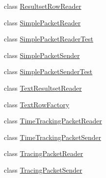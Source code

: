 \begin{DoxyCompactItemize}
\item 
class \mbox{\hyperlink{classcom_1_1mysql_1_1cj_1_1protocol_1_1a_1_1_resultset_row_reader}{Resultset\+Row\+Reader}}
\item 
class \mbox{\hyperlink{classcom_1_1mysql_1_1cj_1_1protocol_1_1a_1_1_simple_packet_reader}{Simple\+Packet\+Reader}}
\item 
class \mbox{\hyperlink{classcom_1_1mysql_1_1cj_1_1protocol_1_1a_1_1_simple_packet_reader_test}{Simple\+Packet\+Reader\+Test}}
\item 
class \mbox{\hyperlink{classcom_1_1mysql_1_1cj_1_1protocol_1_1a_1_1_simple_packet_sender}{Simple\+Packet\+Sender}}
\item 
class \mbox{\hyperlink{classcom_1_1mysql_1_1cj_1_1protocol_1_1a_1_1_simple_packet_sender_test}{Simple\+Packet\+Sender\+Test}}
\item 
class \mbox{\hyperlink{classcom_1_1mysql_1_1cj_1_1protocol_1_1a_1_1_text_resultset_reader}{Text\+Resultset\+Reader}}
\item 
class \mbox{\hyperlink{classcom_1_1mysql_1_1cj_1_1protocol_1_1a_1_1_text_row_factory}{Text\+Row\+Factory}}
\item 
class \mbox{\hyperlink{classcom_1_1mysql_1_1cj_1_1protocol_1_1a_1_1_time_tracking_packet_reader}{Time\+Tracking\+Packet\+Reader}}
\item 
class \mbox{\hyperlink{classcom_1_1mysql_1_1cj_1_1protocol_1_1a_1_1_time_tracking_packet_sender}{Time\+Tracking\+Packet\+Sender}}
\item 
class \mbox{\hyperlink{classcom_1_1mysql_1_1cj_1_1protocol_1_1a_1_1_tracing_packet_reader}{Tracing\+Packet\+Reader}}
\item 
class \mbox{\hyperlink{classcom_1_1mysql_1_1cj_1_1protocol_1_1a_1_1_tracing_packet_sender}{Tracing\+Packet\+Sender}}
\end{DoxyCompactItemize}
